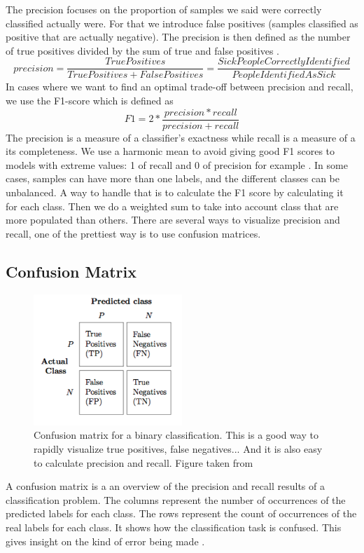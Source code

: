 The precision focuses on the proportion of samples we said were correctly classified actually were. For that we introduce false positives (samples classified as positive that are actually negative). The precision is then defined as the number of true positives divided by the sum of true and false positives \cite{metrics}.
\[precision = \frac{True Positives}{True Positives + False Positives} = \frac{Sick People Correctly Identified}{People Identified As Sick}\]
 In cases where we want to find an optimal trade-off between precision and recall, we use the F1-score which is defined as 
 \[F1 = 2*\frac{precision * recall}{precision + recall} \]
 The precision is a measure of a classifier's exactness while recall is a measure of a its completeness. 
 We use a harmonic mean to avoid giving good F1 scores to models with extreme values: 1 of recall and 0 of precision for example \cite{wiki-f1}. 
In some cases, samples can have more than one labels, and the different classes can be unbalanced. A way to handle that is to calculate the F1 score by calculating it for each class.  Then we do a weighted sum to take into account class that are more populated than others. 
There are several ways to visualize precision and recall, one of the prettiest way is to use confusion matrices. 
\subsection{Confusion Matrix}

\begin{figure}[h]
    \centering
        \includegraphics[width=0.5\textwidth]{figures/02-CM}
        \caption[Confusion matrix]{Confusion matrix for a binary classification. This is a good way to rapidly visualize true positives, false negatives... And it is also easy to calculate precision and recall. Figure taken from \cite{cm_image}}\label{fig:CM}
\end{figure}

A confusion matrix is a an overview of the precision and recall results of a classification problem. The columns represent the number of occurrences of the predicted labels for each class. The rows represent the count of occurrences of the real labels for each class. It shows how the classification task is confused. This gives insight on the kind of error being made \cite{cm}. 


